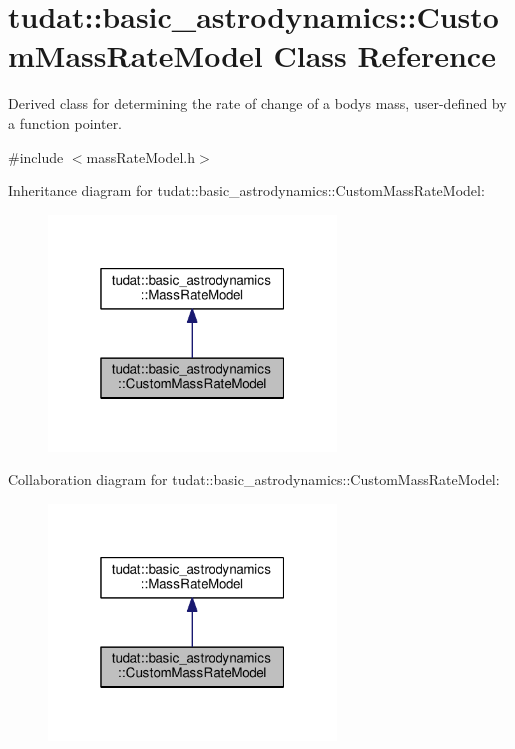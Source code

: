 \hypertarget{classtudat_1_1basic__astrodynamics_1_1CustomMassRateModel}{}\section{tudat\+:\+:basic\+\_\+astrodynamics\+:\+:Custom\+Mass\+Rate\+Model Class Reference}
\label{classtudat_1_1basic__astrodynamics_1_1CustomMassRateModel}


Derived class for determining the rate of change of a body\textquotesingle{}s mass, user-\/defined by a function pointer.  




{\ttfamily \#include $<$mass\+Rate\+Model.\+h$>$}



Inheritance diagram for tudat\+:\+:basic\+\_\+astrodynamics\+:\+:Custom\+Mass\+Rate\+Model\+:
\nopagebreak
\begin{figure}[H]
\begin{center}
\leavevmode
\includegraphics[width=217pt]{classtudat_1_1basic__astrodynamics_1_1CustomMassRateModel__inherit__graph}
\end{center}
\end{figure}


Collaboration diagram for tudat\+:\+:basic\+\_\+astrodynamics\+:\+:Custom\+Mass\+Rate\+Model\+:
\nopagebreak
\begin{figure}[H]
\begin{center}
\leavevmode
\includegraphics[width=217pt]{classtudat_1_1basic__astrodynamics_1_1CustomMassRateModel__coll__graph}
\end{center}
\end{figure}
